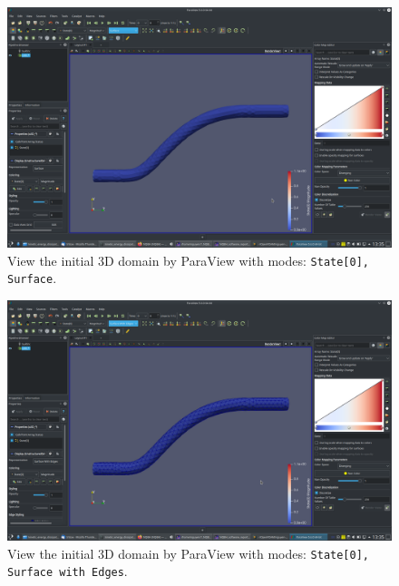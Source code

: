 \documentclass[onsided]{book}
\numberwithin{equation}{section}
\begin{document}
\begin{enumerate}
\begin{enumerate}
        \begin{figure}[H]
            \centering
            \includegraphics[height=0.44\textheight]{initial_domain_3D_State0_Surface}
            \caption{View the initial 3D domain by ParaView with modes: \texttt{State[0], Surface}.}
        \end{figure}
        
        \begin{figure}[H]
            \centering
            \includegraphics[height=0.44\textheight]{initial_domain_3D_State0_Surface_with_Edges}
            \caption{View the initial 3D domain by ParaView with modes: \texttt{State[0], Surface with Edges}.}
        \end{figure}
    

\end{enumerate}
\end{enumerate}
\end{document}
